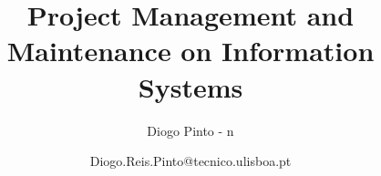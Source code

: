 \documentclass[openany]{./llncs2e/llncs}
\begin{document}
\title{Project Management and Maintenance on Information Systems}
\subtitle{Diogo Pinto - n}
\author{Diogo.Reis.Pinto@tecnico.ulisboa.pt}

\maketitle


\begingroup
\let\cleardoublepage\relax
\let\clearpage\relax
{\def\large{} \def\normalsize{} \tableofcontents}
\endgroup






\newpage

\newpage
\appendix

\newpage


% 
% 
 

 
\end{document}
